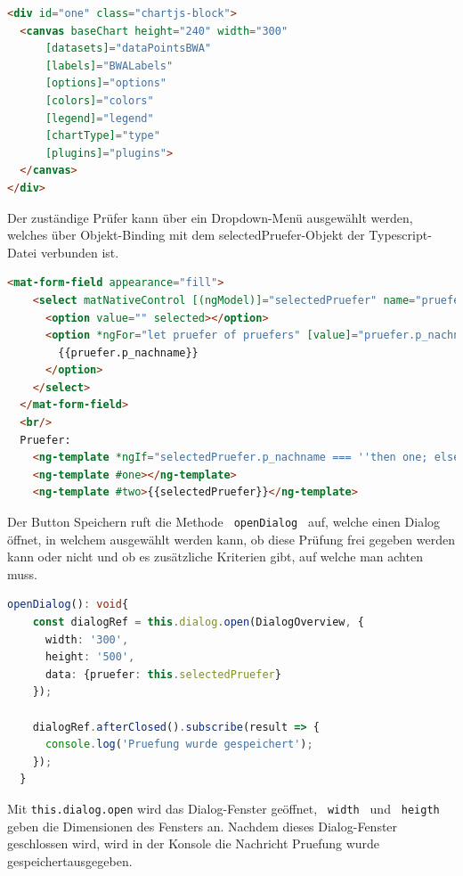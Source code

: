 \begin{lstlisting}[language=HTML, caption={HTML-Code eines Funktionsgraphen}]
<div id="one" class="chartjs-block">
  <canvas baseChart height="240" width="300"
      [datasets]="dataPointsBWA"
      [labels]="BWALabels"
      [options]="options"
      [colors]="colors"
      [legend]="legend"
      [chartType]="type"
      [plugins]="plugins">
  </canvas>
</div>
\end{lstlisting} 

Der zuständige Prüfer kann über ein Dropdown-Menü ausgewählt werden, welches über Objekt-Binding mit dem selectedPruefer-Objekt der 
Typescript-Datei verbunden ist. 

\begin{lstlisting}[language=HTML, caption={HTML-Code des Dropdown-Menüs für den Prüfer}]
  <mat-form-field appearance="fill">
    <select matNativeControl [(ngModel)]="selectedPruefer" name="pruefer">
      <option value="" selected></option>
      <option *ngFor="let pruefer of pruefers" [value]="pruefer.p_nachname + ' ' + pruefer.p_vorname">
        {{pruefer.p_nachname}}
      </option>
    </select>
  </mat-form-field>
  <br/>
  Pruefer:
    <ng-template *ngIf="selectedPruefer.p_nachname === ''then one; else two"></ng-template>
    <ng-template #one></ng-template>
    <ng-template #two>{{selectedPruefer}}</ng-template>
\end{lstlisting}

Der Button Speichern ruft die Methode \lstinline | openDialog | auf, welche einen Dialog öffnet, in welchem ausgewählt werden kann, ob diese Prüfung
frei gegeben werden kann oder nicht und ob es zusätzliche Kriterien gibt, auf welche man achten muss.

\begin{lstlisting}[language=Typescript, caption={openDialog-Methode}]
  openDialog(): void{
    const dialogRef = this.dialog.open(DialogOverview, {
      width: '300',
      height: '500',
      data: {pruefer: this.selectedPruefer}
    });

    dialogRef.afterClosed().subscribe(result => {
      console.log('Pruefung wurde gespeichert');
    });
  }
\end{lstlisting}

Mit \lstinline|this.dialog.open| wird das Dialog-Fenster geöffnet, \lstinline | width | und \lstinline | heigth | geben die Dimensionen des Fensters an. Nachdem 
dieses Dialog-Fenster geschlossen wird, wird in der Konsole die Nachricht \dq Pruefung wurde gespeichert\dq ausgegeben. 


